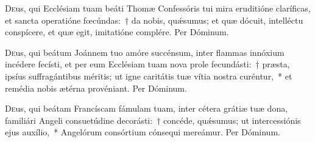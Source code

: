 \documentclass[vesperale_romanum.tex]{subfiles}
\begin{document}

\duplex

\odoctoroptime

\oratio

\lettrine{D}{e}us, qui Ecclésiam tuam beáti Thomæ Confessóris tui mira eruditióne claríficas, et sancta operatióne fœcúndas:~† da nobis, quǽsumus; et quæ dócuit, intelléctu conspícere, et quæ egit, imitatióne complére. Per Dóminum.


\capitdeseqquad

\myrule


\duplex

\oratio

\lettrine{D}{e}us, qui beátum Joánnem tuo amóre succénsum, inter flammas innóxium incédere fecísti, et per eum Ecclésiam tuam nova prole fecundásti:~† præsta, ipsíus suffragántibus méritis; ut igne caritátis tuæ vítia nostra curéntur,~* et remédia nobis ætérna provéniant. Per Dóminum.


\myrule

\newpage


\duplex

\oratio

\lettrine{D}{e}us, qui beátam Francíscam fámulam tuam, inter cétera grátiæ tuæ dona, familiári Angeli consuetúdine decorásti:~† concéde, quǽsumus; ut intercessiónis ejus auxílio,~* Angelórum consórtium cónsequi mereámur.
Per Dóminum.


\end{document}
